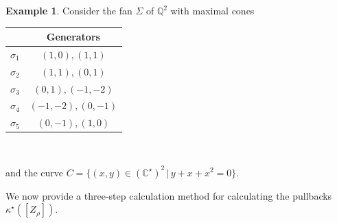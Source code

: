 \documentclass[11pt, reqno]{amsart}
\theoremstyle{plain}
\theoremstyle{definition}
\newtheorem{example}[theorem]{Example}
\theoremstyle{remark}
\begin{document}
\begin{example}\label{refexamp}
Consider the  fan $\Sigma$ of $\mathbb{Q}^{2}$ with maximal cones

\begin{center}
 \begin{tabular}{|c| c |} 
 \hline
  & Generators \\ [1ex] 
 \hline\hline
 $\sigma_{1} $ & $(1, 0), (1,1)$ \\ [2ex] 
 \hline
 $\sigma_{2} $ & $(1, 1), (0,1)$ \\  [2ex] 
 \hline
 $\sigma_{3} $ & $(0, 1),(-1,-2)$ \\ [2ex] 
 \hline
 $\sigma_{4} $ & $(-1, -2) , (0,-1)$ \\ [2ex] 
 \hline
 $\sigma_{5} $ & $(0, -1), (1,0)$ \\  [2ex] 
 \hline
\end{tabular}
\end{center}
\

and the curve
$C =  \{(x, y)\in (\mathbb{C}^{\star})^{2}\,|\, y + x + x^{2} =  0\}.$
\end{example}
We now provide a three-step calculation method for calculating the pullbacks $\kappa^{\star}([Z_{\rho}])$.
\\
\end{document}
